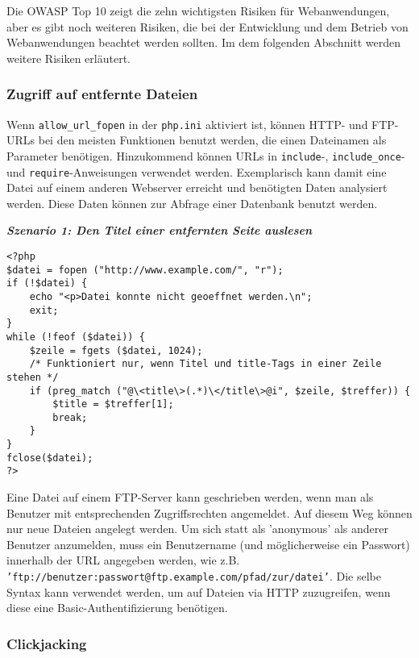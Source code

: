 Die OWASP Top 10 zeigt die zehn wichtigsten Risiken für Webanwendungen, aber es gibt noch weiteren Risiken, die bei der Entwicklung und dem Betrieb von Webanwendungen beachtet werden sollten. Im dem folgenden Abschnitt werden weitere Risiken erläutert.

\subsubsection{Zugriff auf entfernte Dateien}

Wenn \texttt{allow\_url\_fopen} in der \texttt{php.ini} aktiviert ist, können HTTP- und FTP-URLs bei den meisten Funktionen benutzt werden, die einen Dateinamen als Parameter benötigen. Hinzukommend können URLs in \texttt{include}-, \texttt{include\_once}- und \texttt{require}-Anweisungen verwendet werden. Exemplarisch kann damit eine Datei auf einem anderen Webserver erreicht und benötigten Daten analysiert werden. Diese Daten können zur Abfrage einer Datenbank benutzt werden\cite{zaed08}.

\textbf{\textit{Szenario 1: Den Titel einer entfernten Seite auslesen}}\\ 

\begin{lstlisting}
<?php
$datei = fopen ("http://www.example.com/", "r");
if (!$datei) {
	echo "<p>Datei konnte nicht geoeffnet werden.\n";
	exit;
}
while (!feof ($datei)) {
	$zeile = fgets ($datei, 1024);
	/* Funktioniert nur, wenn Titel und title-Tags in einer Zeile stehen */
	if (preg_match ("@\<title\>(.*)\</title\>@i", $zeile, $treffer)) {
		$title = $treffer[1];
		break;
	}
}
fclose($datei);
?>
\end{lstlisting}

Eine Datei auf einem FTP-Server kann geschrieben werden, wenn man als Benutzer mit entsprechenden Zugriffsrechten angemeldet. Auf diesem Weg können nur neue Dateien angelegt werden. Um sich statt als 'anonymous' als anderer Benutzer anzumelden, muss ein Benutzername (und möglicherweise ein Passwort) innerhalb der URL angegeben werden, wie z.B. \texttt{'ftp://benutzer:passwort@ftp.example.com/pfad/zur/datei'}. Die selbe Syntax kann verwendet werden, um auf Dateien via HTTP zuzugreifen, wenn diese eine Basic-Authentifizierung benötigen\cite{zaed08}.

\subsubsection{Clickjacking}

